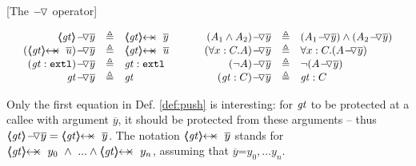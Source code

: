 \begin{definition}
\label{def:push}
[The $ {-\!\,\!{\triangledown}} {}$  operator]  

$
\begin{array}{c}
\begin{array}{l}
\begin{array}{rclcrcl}
  \PushAS y {\inside \re} & \triangleq &  \protectedFrom \re {\overline {y} }
  & \ \ \  \ &
  \PushAS y   {(A_1  \wedge  A_2)} & \triangleq &  (\PushAS y  { A_1})  \wedge  ( \PushAS y  {A_2} )  
\\ 
 \PushAS y {(\protectedFrom \re {\overline {u}})} &  \triangleq& \protectedFrom \re {\overline {u}} 
  & &
 \PushAS y  {(\forall x:C.A)} & \triangleq & \forall x:C.({\PushAS y A} )  
  \\  
  \PushAS y  {(\external \re)} &  \triangleq & {\external \re}  %
  & & 
  \PushAS y  {(\neg A)} &  \triangleq & \neg( {\PushAS y A} )  
    \\
     \PushAS y  {\re} &  \triangleq&   \re %
    & &
    \PushAS y  {(\re:C)} &  \triangleq&   \re:C 
 \end{array}
\end{array}
\end{array}
$
\label{f:Push}
\end{definition}

Only the first equation in  Def.  \ref{def:push}  is interesting: for $\mathit{gt}$ to be {protected at  a} callee with argument $\overline y$, it should be protected from   %
these arguments -- thus
  $\PushAS y {\inside \re} = \protectedFrom {\re} {\overline {y}}$. 
The notation $\protectedFrom {\re} {\overline {y}}$   stands for $\protectedFrom \re {y_0}\  \wedge\  ...  \wedge \protectedFrom \re {y_n}$, assuming that $\overline y$=${y_0, ... y_n}$.

